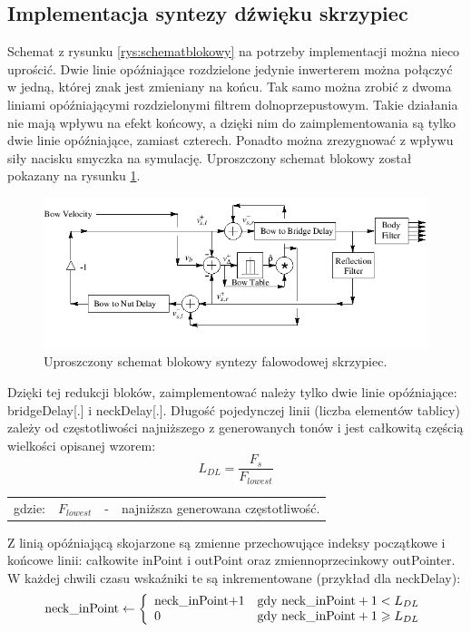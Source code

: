 \subsection{Implementacja syntezy dźwięku skrzypiec}
Schemat z rysunku \ref{rys:schematblokowy} na potrzeby implementacji można nieco uprościć. Dwie linie opóźniające rozdzielone jedynie inwerterem można połączyć w jedną, której znak jest zmieniany na końcu. Tak samo można zrobić z dwoma liniami opóźniającymi rozdzielonymi filtrem dolnoprzepustowym. Takie działania nie mają wpływu na efekt końcowy, a dzięki nim do zaimplementowania są tylko dwie linie opóźniające, zamiast czterech. Ponadto można zrezygnować z wpływu siły nacisku smyczka na symulację. Uproszczony schemat blokowy został pokazany na rysunku \ref{rys:model_violin_schemat}.
\begin{figure}[H]
	\centering
	\includegraphics[width=12cm]{grafiki/model_violin_schemat}
	\captionsetup{justification=centering}
	\caption{Uproszczony schemat blokowy syntezy falowodowej skrzypiec.}
	\label{rys:model_violin_schemat}
\end{figure}
Dzięki tej redukcji bloków, zaimplementować należy tylko dwie linie opóźniające: bridgeDelay[.] i neckDelay[.]. Długość pojedynczej linii (liczba elementów tablicy) zależy od częstotliwości najniższego z generowanych tonów i jest całkowitą częścią wielkości opisanej wzorem:
\begin{equation} \label{equ:model_ndelays}
L_{DL} = \frac{F_s}{F_{lowest}}
\end{equation}
\begin{tabular}{ l l l l}
	gdzie: & $F_{lowest}$ &  - & najniższa generowana częstotliwość. \\
\end{tabular}
Z linią opóźniającą skojarzone są zmienne przechowujące indeksy początkowe i końcowe linii: całkowite inPoint i outPoint oraz zmiennoprzecinkowy outPointer. W każdej chwili czasu wskaźniki te są inkrementowane (przykład dla neckDelay):
\begin{equation} \label{equ:model_wskazniki}
\text{neck\_inPoint} \gets \left \{ 
\begin{array}{ l l}
\text{neck\_inPoint+1} &  \text{gdy neck\_inPoint}+1 < L_{DL} \\
0 &  \text{gdy neck\_inPoint}+1 \geqslant L_{DL}
\end{array}
\right.
\end{equation}

